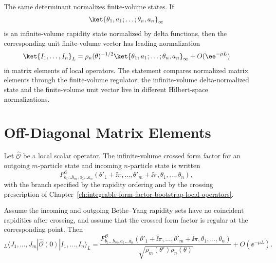 The same determinant normalizes finite-volume states.  If
\[
  \ket{\theta_1,a_1;\ldots;\theta_n,a_n}_{\infty}
\]
is an infinite-volume rapidity state normalized by delta functions, then the
corresponding unit finite-volume vector has leading normalization
\[
  \ket{I_1,\ldots,I_n}_L
  =
  \rho_n(\theta)^{-1/2}
  \ket{\theta_1,a_1;\ldots;\theta_n,a_n}_{\infty}
  +
  O(\ee^{-\mu L})
\]
in matrix elements of local operators.  The statement compares normalized
matrix elements through the finite-volume regulator; the infinite-volume
delta-normalized state and the finite-volume unit vector live in different
Hilbert-space normalizations.

\section{Off-Diagonal Matrix Elements}

Let \(\widehat{\mathcal O}\) be a local scalar operator.  The infinite-volume
crossed form factor for an outgoing \(m\)-particle state and incoming
\(n\)-particle state is written
\[
  F^{\mathcal O}_{b_1\ldots b_m,a_1\ldots a_n}
  (\theta'_1+\ii\pi,\ldots,\theta'_m+\ii\pi,
    \theta_1,\ldots,\theta_n),
\]
with the branch specified by the rapidity ordering and by the crossing
prescription of Chapter~\ref{ch:integrable-form-factor-bootstrap-local-operators}.

\begin{controlledapproximation}
\label{ca:off-diagonal-finite-volume-form-factor}
Assume the incoming and outgoing Bethe--Yang rapidity sets have no coincident
rapidities after crossing, and assume that the crossed form factor is regular
at the corresponding point.  Then
\begin{equation}
  {}_L\!\langle J_1,\ldots,J_m|
  \widehat{\mathcal O}(0)
  |I_1,\ldots,I_n\rangle_L
  =
  \frac{
    F^{\mathcal O}_{b_1\ldots b_m,a_1\ldots a_n}
    (\theta'_1+\ii\pi,\ldots,\theta'_m+\ii\pi,
      \theta_1,\ldots,\theta_n)
  }{
    \sqrt{\rho_m(\theta')\rho_n(\theta)}
  }
  +
  O(\ee^{-\mu L}).
  \label{eq:off-diagonal-finite-volume-form-factor}
\end{equation}
\end{controlledapproximation}

